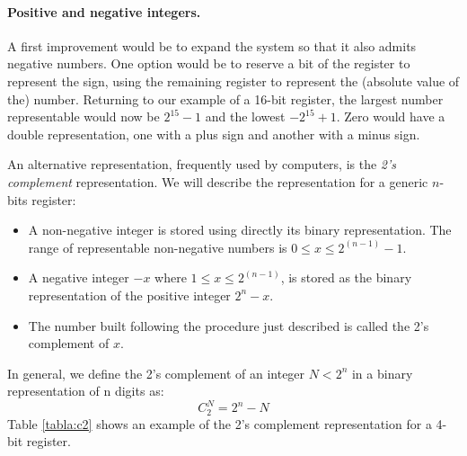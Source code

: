\begin{paracol}{2}
 \paragraph{Positive and negative integers.} A first improvement would be to expand the system so that it also admits negative numbers. One option would be to reserve a bit of the register to represent the sign, using the remaining register to represent the (absolute value of the) number. Returning to our example of a 16-bit register, the largest number representable would now be $2^{15}-1$ and the lowest $-2^{15}+1$. Zero would have a double representation, one with a plus sign and another with a minus sign.

 An alternative representation, frequently used by computers, is the \emph{2's complement} representation.  We will describe the representation for a generic  $n$-bits register:
 \begin{itemize}
     \item A non-negative integer is stored using directly its binary representation. The range of representable non-negative numbers is $0 \le x \le 2^{(n-1)}-1$.
     \item A negative integer $-x$ where  $1 \le x \le 2^{(n-1)}$, is stored as the binary representation of the positive integer $2^{n}-x$.
     \item The number built following the procedure just described is called the 2's complement of $x$. 
 \end{itemize}
 In general, we define the 2's complement of an integer $N<2^n$ in a binary representation of n digits as:
\begin{equation*}
 C_2^N=2^n-N
 \end{equation*}
 Table \ref{tabla:c2} shows an example of the 2's complement representation for a 4-bit register.
 \end{paracol}
 
